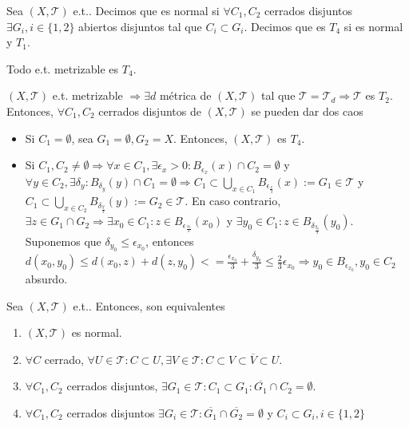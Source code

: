 \begin{defn}
  Sea $( X, \mathcal{T} )$ e.t.. Decimos que es normal si $\forall C_{1}, C_{2}$ cerrados disjuntos $ \exists G_{i}, i \in \{  1, 2 \}$ abiertos disjuntos tal que $ C_{i} \subset G_{i}$. Decimos que es $T_{4}$ si es normal y $T_{1}$.
\end{defn}

\begin{prop}
  Todo e.t. metrizable es $T_{4}$.
\end{prop}

\begin{dem}
  $( X, \mathcal{T} )$ e.t. metrizable $\Rightarrow \exists d$ métrica de $( X, \mathcal{T} )$ tal que $\mathcal{T} = \mathcal{T}_{d} \Rightarrow \mathcal{T}$ es $T_{2}$. Entonces, $\forall C_{1}, C_{2}$ cerrados disjuntos de $( X, \mathcal{T} )$ se pueden dar dos caos
  \begin{itemize}
    \item Si $C_{1} = \emptyset$, sea $G_{1} = \emptyset, G_{2} = X$. Entonces, $( X, \mathcal{T} )$ es $T_{4}$.
    \item Si $C_{1}, C_{2} \neq \emptyset \Rightarrow \forall x \in C_{1}, \exists \epsilon_{x} > 0: B_{\epsilon_{x}}(x) \cap C_{2} = \emptyset$ y $\forall y \in C_{2}, \exists \delta_{y}: B_{\delta_{y}}(y) \cap C_{1} = \emptyset \Rightarrow C_{1} \subset \bigcup_{x \in C_{1}} B_{\epsilon_{\frac{x}{3}}}(x) := G_{1} \in \mathcal{T}$ y $C_{1} \subset \bigcup_{x \in C_{2}} B_{\delta_{\frac{y}{3}}}(y) := G_{2} \in \mathcal{T}$. En caso contrario, $\exists z \in G_{1} \cap G_{2} \Rightarrow \exists x_{0} \in C_{1} : z \in B_{\epsilon_{\frac{x_{0}}{3}}}(x_{0})$ y $\exists y_{0} \in C_{1} : z \in B_{\delta_{\frac{y_{0}}{3}}}(y_{0})$. Suponemos que $\delta_{y_{0}} \leq \epsilon_{x_{0}}$, entonces $ d(x_{0}, y_{0}) \leq d(x_{0}, z) + d(z, y_{0}) < = \frac{\epsilon_{x_{0}}}{3} + \frac{\delta_{y_{0}}}{3} \leq \frac{2}{3}\epsilon_{x_{0}} \Rightarrow y_{0} \in B_{\epsilon_{x_{0}}}, y_{0} \in C_{2}$ absurdo.
  \end{itemize}
\end{dem}

\begin{prop}
  Sea $( X, \mathcal{T} )$ e.t.. Entonces, son equivalentes
  \begin{enumerate}[label=(\roman*)]
    \item $( X, \mathcal{T} )$ es normal.
    \item $\forall C$ cerrado, $\forall U \in \mathcal{T}: C \subset U, \exists V \in \mathcal{T}: C \subset V \subset \overline{V} \subset U$.
    \item $\forall C_{1}, C_{2}$ cerrados disjuntos, $\exists G_{1} \in \mathcal{T}: C_{1} \subset G_{1}: \overline{G_{1}} \cap C_{2} = \emptyset$.
    \item $\forall C_{1}, C_{2}$ cerrados disjuntos $\exists G_{i} \in \mathcal{T} : \overline{G_{1}} \cap \overline{G_{2}} = \emptyset$ y $C_{i} \subset G_{i}, i \in \{ 1, 2 \}$
  \end{enumerate}
\end{prop}

